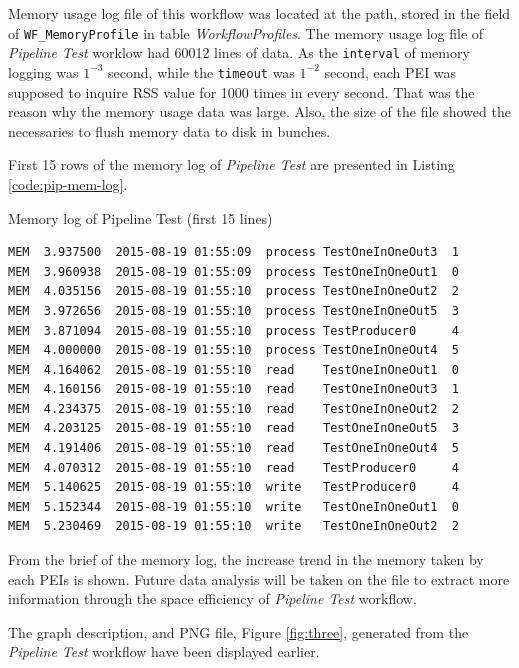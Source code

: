 \documentclass[10pt,twoside,openright,logo]{report}
\begin{document}
\figwf
\figpe
\figpei


Memory usage log file of this workflow was located at the path, stored in the field of \texttt{WF_MemoryProfile} in table \textit{WorkflowProfiles}.
The memory usage log file of \textit{Pipeline Test} worklow had 60012 lines of data. As the \texttt{interval} of memory logging was $1^{-3}$ second, while the \texttt{timeout} was $1^{-2}$ second, each PEI was supposed to inquire RSS value for 1000 times in every second. That was the reason why the memory usage data was large. Also, the size of the file showed the necessaries to flush memory data to disk in bunches.

First 15 rows of the memory log of \textit{Pipeline Test} are presented in Listing \ref{code:pip-mem-log}.

\begin{listing}
\caption{Memory log of Pipeline Test (first 15 lines)}
\label{code:pip-mem-log}
\begin{verbatim}
MEM  3.937500  2015-08-19 01:55:09  process TestOneInOneOut3  1
MEM  3.960938  2015-08-19 01:55:09  process TestOneInOneOut1  0
MEM  4.035156  2015-08-19 01:55:10  process TestOneInOneOut2  2
MEM  3.972656  2015-08-19 01:55:10  process TestOneInOneOut5  3
MEM  3.871094  2015-08-19 01:55:10  process TestProducer0     4
MEM  4.000000  2015-08-19 01:55:10  process TestOneInOneOut4  5
MEM  4.164062  2015-08-19 01:55:10  read    TestOneInOneOut1  0
MEM  4.160156  2015-08-19 01:55:10  read    TestOneInOneOut3  1
MEM  4.234375  2015-08-19 01:55:10  read    TestOneInOneOut2  2
MEM  4.203125  2015-08-19 01:55:10  read    TestOneInOneOut5  3
MEM  4.191406  2015-08-19 01:55:10  read    TestOneInOneOut4  5
MEM  4.070312  2015-08-19 01:55:10  read    TestProducer0     4
MEM  5.140625  2015-08-19 01:55:10  write   TestProducer0     4
MEM  5.152344  2015-08-19 01:55:10  write   TestOneInOneOut1  0
MEM  5.230469  2015-08-19 01:55:10  write   TestOneInOneOut2  2
\end{verbatim}
\end{listing}

From the brief of the memory log, the increase trend in the memory taken by each PEIs is shown. Future data analysis will be taken on the file to extract more information through the space efficiency of \textit{Pipeline Test} workflow.

The graph description, and PNG file, Figure \ref{fig:three}, generated from the \textit{Pipeline Test} workflow have been displayed earlier.
\end{document}
